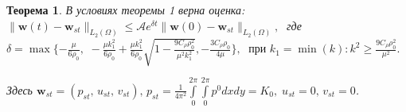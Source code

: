 \documentclass{beamer}
\newtheorem{Th}{Теорема}
\theoremstyle{plain}
\def\cfrac#1#2{\displaystyle{\frac{#1}{#2}}}
\begin{document}
\begin{frame}
\begin{Th}  В условиях теоремы 1 верна оценка:
$
\displaystyle \| \mathbf{w}(t) - \mathbf{w}_{st} \|_{L_2(\Omega)} \leqslant \mathcal{A} e^{ \delta t} \| \mathbf{w}(0) -\mathbf{w}_{st} \|_{L_2(\Omega)}, \;
$
где 
 $\delta = \max \{ -\frac{\mu}{6\rho_0},\,\, 
 - \frac{\mu k_1^2 }{6 \rho_0}
 + \frac{\mu k_1^2}{6 \rho_0} \sqrt{ 1    - \frac{9 C_\rho \rho_0^2 }{\mu^2 k_1^2} },
 - \cfrac{3 C_{{\rho}} {{\rho}_0}}{4 \mu} \}, \;
 \mbox{ при }   k_1 = \min (k) :  k^2 \ge  \frac{9 C_\rho \rho_0^2 }{\mu^2 }.
 $

Здесь 
$
\mathbf{w}_{st} = (p_{st},\, u_{st},\, v_{st}),\, 
p_{st}=\cfrac{1}{4\pi^2} \int \limits_0^{2\pi} \int \limits_0^{2\pi} p^0 dxdy = K_0, 
\; u_{st}=0,\, v_{st}=0$.
\end{Th}
	\end{frame}	
	
\end{document}
